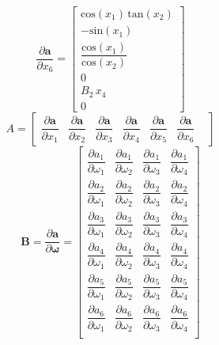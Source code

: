 \begin{equation}
	\dfrac{\partial \boldsymbol{ a}}{\partial  x_6} = 
	\begin{bmatrix}
	\mathrm{cos}\left(x_1 \right)\,\mathrm{tan}\left(x_2 \right)\\
	-\mathrm{sin}\left(x_1 \right)\\
	\dfrac{\mathrm{cos}\left(x_1 \right)}{\mathrm{cos}\left(x_2 \right)}\\
	0\\
	B_2 \,x_4 \\
	0
	\end{bmatrix}
\end{equation}
\begin{equation}
	A = \begin{bmatrix}
		\dfrac{\partial \boldsymbol{ a}}{\partial  x_1} &
		\dfrac{\partial \boldsymbol{ a}}{\partial  x_2} &
		\dfrac{\partial \boldsymbol{ a}}{\partial  x_3} &
		\dfrac{\partial \boldsymbol{ a}}{\partial  x_4} &
		\dfrac{\partial \boldsymbol{ a}}{\partial  x_5} &
		\dfrac{\partial \boldsymbol{ a}}{\partial  x_6} &
	\end{bmatrix}
\end{equation}
\begin{equation}
	\boldsymbol B = \dfrac{\partial \boldsymbol a}{\partial \boldsymbol \omega} = 
	\begin{bmatrix}
		\dfrac{\partial  a_1}{\partial  \omega_1}&
		\dfrac{\partial  a_1}{\partial  \omega_2}&
		\dfrac{\partial  a_1}{\partial  \omega_3}&
		\dfrac{\partial  a_1}{\partial  \omega_4}
		\\[1em]
		\dfrac{\partial  a_2}{\partial  \omega_1}&
		\dfrac{\partial  a_2}{\partial  \omega_2}&
		\dfrac{\partial  a_2}{\partial  \omega_3}&
		\dfrac{\partial  a_2}{\partial  \omega_4}
		\\[1em]
		\dfrac{\partial  a_3}{\partial  \omega_1}&
		\dfrac{\partial  a_3}{\partial  \omega_2}&
		\dfrac{\partial  a_3}{\partial  \omega_3}&
		\dfrac{\partial  a_3}{\partial  \omega_4}
		\\[1em]
		\dfrac{\partial  a_4}{\partial  \omega_1}&
		\dfrac{\partial  a_4}{\partial  \omega_2}&
		\dfrac{\partial  a_4}{\partial  \omega_3}&
		\dfrac{\partial  a_4}{\partial  \omega_4}
		\\[1em]
		\dfrac{\partial  a_5}{\partial  \omega_1}&
		\dfrac{\partial  a_5}{\partial  \omega_2}&
		\dfrac{\partial  a_5}{\partial  \omega_3}&
		\dfrac{\partial  a_5}{\partial  \omega_4}
		\\[1em]
		\dfrac{\partial  a_6}{\partial  \omega_1}&
		\dfrac{\partial  a_6}{\partial  \omega_2}&
		\dfrac{\partial  a_6}{\partial  \omega_3}&
		\dfrac{\partial  a_6}{\partial  \omega_4}
		\\[1em]
	\end{bmatrix}
\end{equation}
